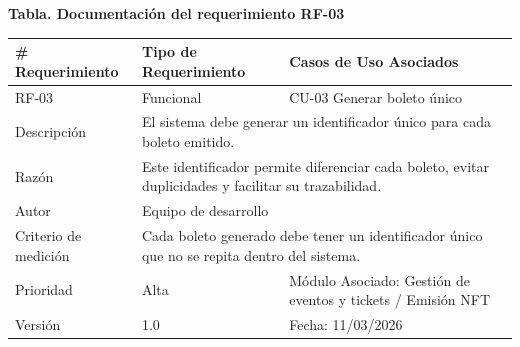 \documentclass[12pt,letterpaper]{article}
\begin{document}
\noindent
\begin{minipage}{\textwidth}
\centering
\scriptsize
\renewcommand{\arraystretch}{0.9}
\setlength{\tabcolsep}{3pt}
\setlength{\arrayrulewidth}{0.5pt}

\textbf{Tabla. Documentación del requerimiento RF-03}

\vspace{2pt}

\begin{tabularx}{\textwidth}{|p{2.6cm}|X|p{3.4cm}|}
\hline
\# Requerimiento & Tipo de Requerimiento & Casos de Uso Asociados \\ \hline
RF-03 & Funcional & CU-03 Generar boleto único \\ \hline
Descripción & \multicolumn{2}{X|}{El sistema debe generar un identificador único para cada boleto emitido.} \\ \hline
Razón & \multicolumn{2}{X|}{Este identificador permite diferenciar cada boleto, evitar duplicidades y facilitar su trazabilidad.} \\ \hline
Autor & \multicolumn{2}{X|}{Equipo de desarrollo} \\ \hline
Criterio de medición & \multicolumn{2}{X|}{Cada boleto generado debe tener un identificador único que no se repita dentro del sistema.} \\ \hline
Prioridad & Alta & Módulo Asociado: Gestión de eventos y tickets / Emisión NFT \\ \hline
Versión & 1.0 & Fecha: 11/03/2026 \\ \hline
\end{tabularx}
\end{minipage}

\vspace{0.2cm}
\end{document}
